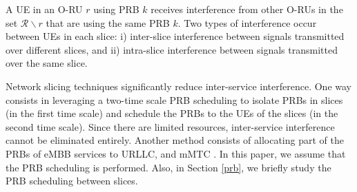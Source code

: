 \documentclass[lettersize,journal]{IEEEtran}
\begin{document}
A UE in an O-RU $r$ using PRB $k$ receives interference from other O-RUs in the set $\mathcal{R}\backslash r$ that are using the same PRB $k$. Two types of interference occur between UEs in each slice: i) inter-slice interference between signals transmitted over different slices, and ii) intra-slice interference between signals transmitted over the same slice.%
 
Network slicing techniques significantly reduce inter-service interference.
One way consists in leveraging a two-time scale PRB scheduling to isolate PRBs in slices (in the first time scale) and schedule the PRBs to the UEs of the slices (in the second time scale). Since there are limited resources, inter-service interference cannot be eliminated entirely. Another method consists of allocating part of the PRBs of eMBB services to URLLC, and mMTC \cite{alsenwi2021intelligent, setayesh2020joint, mei2021intelligent}. In this paper, we assume that the PRB scheduling is performed. Also, in Section \ref{prb}, we briefly study the PRB scheduling between slices.
\end{document}
